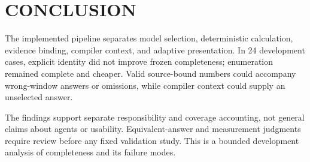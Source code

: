 \section{\uppercase{Conclusion}}
\label{sec:conclusion}
\noindent The implemented pipeline separates model selection, deterministic calculation, evidence binding, compiler context, and adaptive presentation. In 24 development cases, explicit identity did not improve frozen completeness; enumeration remained complete and cheaper. Valid source-bound numbers could accompany wrong-window answers or omissions, while compiler context could supply an unselected answer.\draftassist

The findings support separate responsibility and coverage accounting, not general claims about agents or usability. Equivalent-answer and measurement judgments require review before any fixed validation study. This is a bounded development analysis of completeness and its failure modes.

